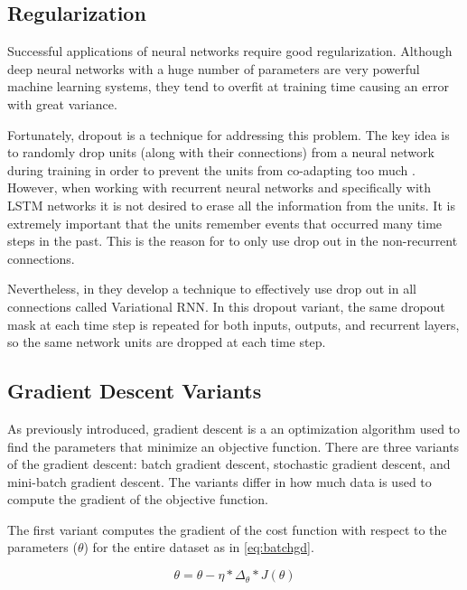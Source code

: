 \subsection{Regularization}

Successful applications of neural networks require good regularization. Although deep neural networks with a huge number of parameters are very powerful machine learning systems, they tend to overfit at training time causing an error with great variance. 

Fortunately, dropout is a technique for addressing this problem. The key idea is to randomly drop units (along with their connections) from a neural network during training in order to prevent the units from co-adapting too much \cite{srivastava2013improving}. However, when working with recurrent neural networks and specifically with LSTM networks it is not desired to erase all the information from the units. It is extremely important that the units remember events that occurred many time steps in the past. This is the reason for \cite{zaremba2014recurrent} to only use drop out in the non-recurrent connections. 

Nevertheless, in \cite{gal2015theoretically} they develop a technique to effectively use drop out in all connections called Variational RNN. In this dropout variant, the same dropout mask at each time step is repeated for both inputs, outputs, and recurrent layers, so the same network units are dropped at each time step. 

\subsection{Gradient Descent Variants}
As previously introduced, gradient descent is a an optimization algorithm used to find the parameters that minimize an objective function. There are three variants of the gradient descent: batch gradient descent, stochastic gradient descent, and mini-batch gradient descent. The variants differ in how much data is used to compute the gradient of the objective function. 

The first variant computes the gradient of the cost function with respect to the parameters ($\theta$) for the entire dataset as in \ref{eq:batchgd}.

\begin{equation} \label{eq:batchgd}
\theta=\theta-\eta * \Delta_\theta * J(\theta)
\end{equation}

